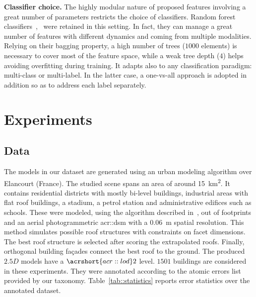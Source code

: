 \documentclass[runningheads]{llncs}
\begin{document}
\noindent
\textbf{Classifier choice.} The highly modular nature of proposed features involving a great number of parameters restricts the choice of classifiers. Random forest classifiers~\cite{breiman2001random},~\cite{criminisi2013decision} were retained in this setting. In fact, they can manage a great number of features with different dynamics and coming from multiple modalities. Relying on their bagging property, a high number of trees ($1000$ elements) is necessary to cover most of the feature space, while a weak tree depth ($4$) helps avoiding overfitting during training. It adapts also to any classification paradigm: multi-class or multi-label. In the latter case, a one-vs-all approach is adopted in addition so as to address each label separately.
\section{Experiments}
\subsection{Data}

The models in our dataset are generated using an urban modeling algorithm over Elancourt (France). The studied scene spans an area of around \SI{15}{\km\squared}. It contains residential districts with mostly bi-level buildings, industrial areas with flat roof buildings, a stadium, a petrol station and administrative edifices such as schools. These were modeled, using the algorithm described in~\cite{Durupt2006}, out of footprints and an aerial photogrammetric \acrshort{acr::dsm} with a \SI{0.06}{\m} spatial resolution. This method simulates possible roof structures with constraints on facet dimensions. The best roof structure is selected after scoring the extrapolated roofs. Finally, orthogonal building fa\c{c}ades connect the best roof to the ground. The produced $2.5D$ models have a $\acrshort{acr::lod}2$ level.  $1501$ buildings are considered in these experiments. They were annotated according to the atomic errors list provided by our taxonomy. Table~\ref{tab::statistics} reports error statistics over the annotated dataset.
\end{document}
